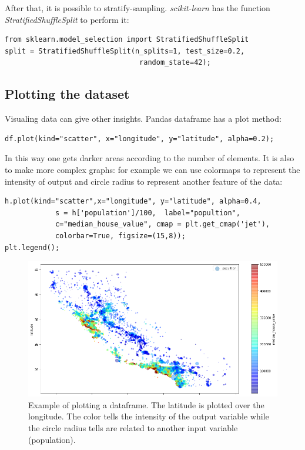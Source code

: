 \documentclass[12pt, letterpaper]{article}
\theoremstyle{definition}
\let\ti\textit
\begin{document}
After that, it is possible to stratify-sampling. \ti{scikit-learn} has the function \ti{StratifiedShuffleSplit} to perform it:
\begin{lstlisting}
from sklearn.model_selection import StratifiedShuffleSplit
split = StratifiedShuffleSplit(n_splits=1, test_size=0.2, 
								random_state=42);
\end{lstlisting}

\subsection{Plotting the dataset}
Visualing data can give other insights.
Pandas dataframe has a plot method:
\begin{lstlisting}[caption=Example of Pandas dataframe plot method.]
df.plot(kind="scatter", x="longitude", y="latitude", alpha=0.2);
\end{lstlisting}
In this way one gets darker areas according to the number of elements.
It is also to make more complex graphs: for example we can use colormaps to represent the intensity of output and circle radius to represent another feature of the data:
\begin{lstlisting}[caption=Example of Pandas dataframe plot with colormap and variable radius of scattered circles.]
h.plot(kind="scatter",x="longitude", y="latitude", alpha=0.4, 
			s = h['population']/100,  label="popultion", 
			c="median_house_value", cmap = plt.get_cmap('jet'), 
			colorbar=True, figsize=(15,8));
plt.legend();
\end{lstlisting}

\begin{figure}
\includegraphics[scale=0.48]{img/DatasetCmap}
\caption{Example of plotting a dataframe. The latitude is plotted over the longitude. The color tells the intensity of the output variable while the circle radius tells are related to another input variable (population).}
\label{californiaHouses}
\end{figure}
\end{document}
